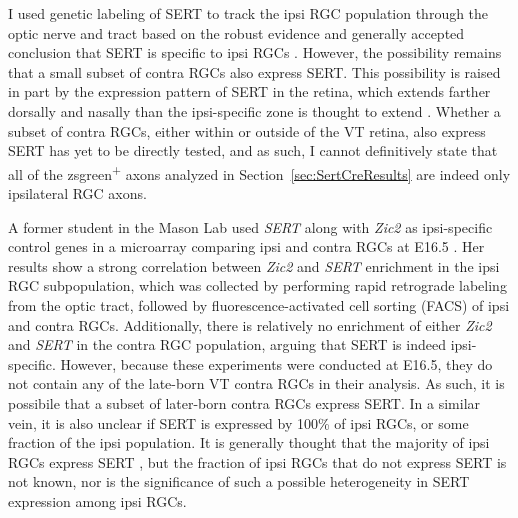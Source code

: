 \label{sec:TechnicalSERT}
I used genetic labeling of SERT to track the ipsi RGC population through the optic nerve and tract based on the robust evidence and generally accepted conclusion that SERT is specific to ipsi RGCs \cite{garcia2010zic2,koch2011pathway,upton1999excess}.
However, the possibility remains that a small subset of contra RGCs also express SERT.
This possibility is raised in part by the expression pattern of SERT in the retina, which extends farther dorsally and nasally than the ipsi-specific zone is thought to extend \cite{upton1999excess}.
Whether a subset of contra RGCs, either within or outside of the VT retina, also express SERT has yet to be directly tested, and as such, I cannot definitively state that all of the zsgreen\textsuperscript{+} axons analyzed in Section~\ref{sec:SertCreResults} are indeed only ipsilateral RGC axons.

A former student in the Mason Lab used \emph{SERT} along with \emph{Zic2} as ipsi-specific control genes in a microarray comparing ipsi and contra RGCs at E16.5 \cite{wang2016ipsilateral}.
Her results show a strong correlation between \emph{Zic2} and \emph{SERT} enrichment in the ipsi RGC subpopulation, which was collected by performing rapid retrograde labeling from the optic tract, followed by fluorescence-activated cell sorting (FACS) of ipsi and contra RGCs.
Additionally, there is relatively no enrichment of either \emph{Zic2} and \emph{SERT} in the contra RGC population, arguing that SERT is indeed ipsi-specific.
However, because these experiments were conducted at E16.5, they do not contain any of the late-born VT contra RGCs in their analysis.
As such, it is possibile that a subset of later-born contra RGCs express SERT.
In a similar vein, it is also unclear if SERT is expressed by 100\% of ipsi RGCs, or some fraction of the ipsi population.
It is generally thought that the majority of ipsi RGCs express SERT \cite{garcia2010zic2,koch2011pathway}, but the fraction of ipsi RGCs that do not express SERT is not known, nor is the significance of such a possible heterogeneity in SERT expression among ipsi RGCs.

